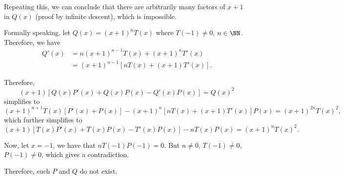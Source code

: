\begin{enumerate}
          Repeating this, we can conclude that there are arbitrarily many factors of \(x + 1\) in \(Q(x)\) (proof by infinite descent), which is impossible.

          Formally speaking, let \(Q(x) = (x + 1)^n T(x)\) where \(T(-1) \neq 0\), \(n \in \NN\). Therefore, we have
          \begin{align*}
              Q'(x) & = n (x+1)^{n - 1} T(x) + (x+1)^n T'(x)              \\
                    & = (x+1)^{n - 1} \left[n T(x) + (x + 1)T'(x)\right].
          \end{align*}

          Therefore,
          \[
              (x + 1) \left[Q(x)P'(x) + Q(x)P(x) - Q'(x)P(x)\right] = Q(x)^2
          \]
          simplifies to
          \[
              (x+1)^{n + 1}T(x)\left[P'(x) + P(x)\right] - (x + 1)^{n} \left[nT(x) + (x + 1)T'(x)\right]P(x) = (x + 1)^{2n}T(x)^2,
          \]
          which further simplifies to
          \[
              (x + 1)\left[T(x)P'(x) + T(x)P(x) - T'(x) P(x)\right] - n T(x) P(x) = (x + 1)^{n}T(x)^2.
          \]

          Now, let \(x = -1\), we have that \(n T(-1) P(-1) = 0\). But \(n \neq 0\), \(T(-1) \neq 0\), \(P(-1) \neq 0\), which gives a contradiction.

          Therefore, such \(P\) and \(Q\) do not exist.
\end{enumerate}